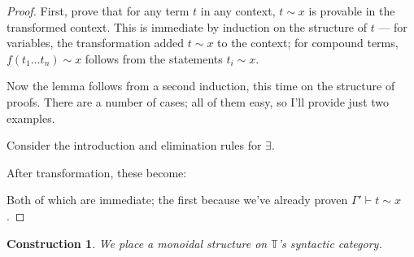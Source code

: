 \documentclass{article}
\newtheorem{construction}[theorem]{Construction}
\newcommand*{\T}{\mathbb{T}}
\begin{document}
\begin{proof}
    First, prove that for any term \(t\) in any context, \(t \sim x\) is provable in the transformed context.
    This is immediate by induction on the structure of \(t\) ---
    for variables, the transformation added \(t \sim x\) to the context;
    for compound terms, \(f(t_1 \dots t_n) \sim x\) follows from the statements \(t_i \sim x\).

    Now the lemma follows from a second induction, this time on the structure of proofs.
    There are a number of cases; all of them easy, so I'll provide just two examples.
    
    Consider the introduction and elimination rules for \(\exists\).
    After transformation, these become:
    Both of which are immediate; the first because we've already proven \(\Gamma' \vdash t \sim x\).
\end{proof}

\begin{construction}
    We place a monoidal structure on \(\T\)'s syntactic category.
\end{construction}
\end{document}
